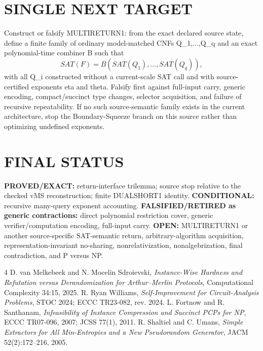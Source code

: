 \documentclass[11pt]{article}
\begin{document}
\section*{SINGLE NEXT TARGET}
Construct or falsify MULTIRETURN1: from the exact declared source state, define a finite family of ordinary model-matched CNFs Q_1,...,Q_q and an exact polynomial-time combiner B such that
\[
SAT(F)=B(SAT(Q_1),\ldots,SAT(Q_q)),
\]
with all Q_i constructed without a current-scale SAT call and with source-certified exponents eta and theta. Falsify first against full-input carry, generic encoding, compact/succinct type changes, selector acquisition, and failure of recursive repeatability. If no such source-semantic family exists in the current architecture, stop the Boundary-Squeeze branch on this source rather than optimizing undefined exponents.

\section*{FINAL STATUS}
\textbf{PROVED/EXACT:} return-interface trilemma; source stop relative to the checked vMS reconstruction; finite DUALSHORT1 identity. \textbf{CONDITIONAL:} recursive many-query exponent accounting. \textbf{FALSIFIED/RETIRED as generic contractions:} direct polynomial restriction cover, generic verifier/computation encoding, full-input carry. \textbf{OPEN:} MULTIRETURN1 or another source-specific SAT-semantic return, arbitrary-algorithm acquisition, representation-invariant no-sharing, nonrelativization, nonalgebrization, final contradiction, and P versus NP.

\begin{thebibliography}{4}
 D. van Melkebeek and N. Mocelin Sdroievski, \emph{Instance-Wise Hardness and Refutation versus Derandomization for Arthur--Merlin Protocols}, Computational Complexity 34:15, 2025.
 R. Ryan Williams, \emph{Self-Improvement for Circuit-Analysis Problems}, STOC 2024; ECCC TR23-082, rev. 2024.
 L. Fortnow and R. Santhanam, \emph{Infeasibility of Instance Compression and Succinct PCPs for NP}, ECCC TR07-096, 2007; JCSS 77(1), 2011.
 R. Shaltiel and C. Umans, \emph{Simple Extractors for All Min-Entropies and a New Pseudorandom Generator}, JACM 52(2):172--216, 2005.
\end{thebibliography}
\end{document}
